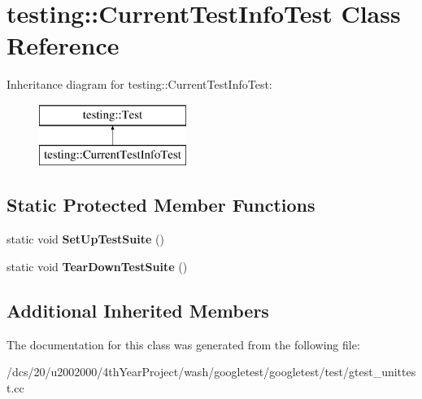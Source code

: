 \hypertarget{classtesting_1_1CurrentTestInfoTest}{}\section{testing\+:\+:Current\+Test\+Info\+Test Class Reference}
\label{classtesting_1_1CurrentTestInfoTest}
Inheritance diagram for testing\+:\+:Current\+Test\+Info\+Test\+:\begin{figure}[H]
\begin{center}
\leavevmode
\includegraphics[height=2.000000cm]{classtesting_1_1CurrentTestInfoTest}
\end{center}
\end{figure}
\subsection*{Static Protected Member Functions}
\begin{DoxyCompactItemize}
\item 
\mbox{\label{classtesting_1_1CurrentTestInfoTest_a96ea319066279ee9a8472b8581fa7bbf}} 
static void {\bfseries Set\+Up\+Test\+Suite} ()
\item 
\mbox{\label{classtesting_1_1CurrentTestInfoTest_a6d4688ba63080fe8fc44a6677503de76}} 
static void {\bfseries Tear\+Down\+Test\+Suite} ()
\end{DoxyCompactItemize}
\subsection*{Additional Inherited Members}


The documentation for this class was generated from the following file\+:\begin{DoxyCompactItemize}
\item 
/dcs/20/u2002000/4th\+Year\+Project/wash/googletest/googletest/test/gtest\+\_\+unittest.\+cc\end{DoxyCompactItemize}
